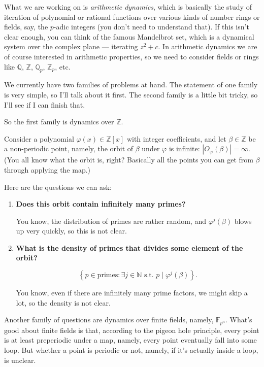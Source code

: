\documentclass{amsart}
\theoremstyle{definition}
\theoremstyle{remark}
\newcommand{\N}{\mathbb{N}}
\newcommand{\Q}{\mathbb{Q}}
\newcommand{\Z}{\mathbb{Z}}
\newcommand{\set}[1]{\left\{#1\right\}}
\renewcommand{\b}{\beta}
\newcommand{\F}{\mathbb{F}}
\renewcommand{\phi}{\varphi}
\begin{document}
What we are working on is \emph{arithmetic dynamics}, which is
basically the study of iteration of polynomial or rational functions
over various kinds of number rings or fields, say, the $p$-adic
integers (you don't need to understand that). If this isn't clear
enough, you can think of the famous Mandelbrot set, which is a
dynamical system over the complex plane --- iterating $z^2 + c$. In
arithmetic dynamics we are of course interested in arithmetic
properties, so we need to consider fields or rings like $\Q$, $\Z$,
$\Q_p$, $\Z_p$, etc.

We currently have two families of problems at hand. The statement of
one family is very simple, so I'll talk about it first. The second
family is a little bit tricky, so I'll see if I can finish that.

So the first family is dynamics over $\Z$.

Consider a polynomial $\phi(x) \in \Z[x]$ with integer
coefficients, and let $\b \in \Z$ be a non-periodic point, namely,
the orbit of $\b$ under $\phi$ is infinite: $|O_\phi(\b)| =
\infty$. (You all know what the orbit is, right? Basically all the
points you can get from $\b$ through applying the map.)

Here are the questions we can ask:

\begin{enumerate}
\item \textbf{Does this orbit contain infinitely many primes?}

  You know, the distribution of primes are rather random, and
  $\phi^j(\b)$ blows up very quickly, so this is not clear.

\item \textbf{What is the density of primes that divides some element of the
  orbit?}

  \[
  \set{p \in \mathrm{primes} : \exists j \in \N \text{ s.t. } p \mid
    \phi^j(\b)}.
  \]

  You know, even if there are infinitely many prime factors, we might
  skip a lot, so the density is not clear.
\end{enumerate}

Another family of questions are dynamics over finite fields, namely,
$\F_{p^n}$. What's good about finite fields is that, according to the
pigeon hole principle, every point is at least preperiodic under a
map, namely, every point eventually fall into some loop. But whether
a point is periodic or not, namely, if it's actually inside a loop, is
unclear.
\end{document}
